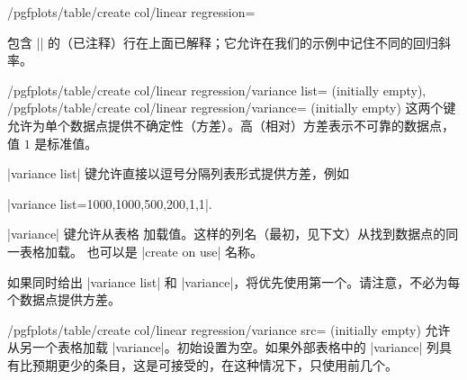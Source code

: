 {\begin{stylekey}{/pgfplots/table/create col/linear regression=}
\begin{keylist}
\begin{codeexample}[]
\end{codeexample}

        包含 |\slope| 的（已注释）行在上面已解释；它允许在我们的示例中记住不同的回归斜率。
    \end{keylist}

    \begin{keylist}{%
        /pgfplots/table/create col/linear regression/variance list= (initially empty),
        /pgfplots/table/create col/linear regression/variance= (initially empty)%
    }
        这两个键允许为单个数据点提供不确定性（方差）。高（相对）方差表示不可靠的数据点，值 $1$ 是标准值。

        |variance list| 键允许直接以逗号分隔列表形式提供方差，例如

        |variance list={1000,1000,500,200,1,1}|.

        |variance| 键允许从表格  加载值。这样的列名（最初，见下文）从找到数据点的同一表格加载。 也可以是 |create on use| 名称。
\begin{codeexample}[]
\end{codeexample}

        如果同时给出 |variance list| 和 |variance|，将优先使用第一个。请注意，不必为每个数据点提供方差。
    \end{keylist}

    \begin{key}{/pgfplots/table/create col/linear regression/variance src= (initially empty)}
        允许从另一个表格加载 |variance|。初始设置为空。如果外部表格中的 |variance| 列具有比预期更少的条目，这是可接受的，在这种情况下，只使用前几个。
    \end{key}


\end{stylekey}}
